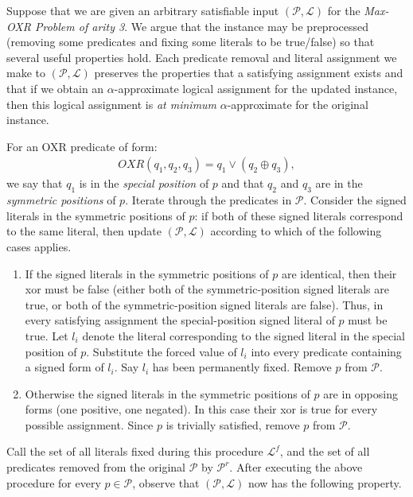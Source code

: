 \documentclass{article}
\begin{document}
Suppose that we are given an arbitrary satisfiable input $(\mathcal{P}, \mathcal{L})$ for the \textit{Max-OXR Problem of arity 3}. We argue that the instance may be preprocessed (removing some predicates and fixing some literals to be true/false) so that several useful properties hold.
Each predicate removal and literal assignment we make to $(\mathcal{P}, \mathcal{L})$ preserves the properties that a satisfying assignment exists and that if we obtain an $\alpha$-approximate logical assignment for the updated instance, then this logical assignment is \emph{at minimum} $\alpha$-approximate for the original instance.

For an OXR predicate of form:
\vspace{-2mm}
\begin{align*}\label{oxrform}
OXR(q_1,q_2,q_3)=q_1 \vee (q_2 \oplus q_3),
\end{align*}
we say that $q_1$ is in the \textit{special position} of $p$ and that $q_2$ and $q_3$ are in the \textit{symmetric positions} of $p$. Iterate through the predicates in $\mathcal{P}$.  Consider the signed literals in the symmetric positions of $p$: if both of these signed literals correspond to the same literal, then update $(\mathcal{P}, \mathcal{L})$ according to which of the following cases applies.

\begin{enumerate}
\item If the signed literals in the symmetric positions of $p$ are identical, then their xor must be false (either both of the symmetric-position signed literals are true, or both of the symmetric-position signed literals are false). Thus, in every satisfying assignment the special-position signed literal of $p$ must be true. 
Let $l_i$ denote the literal corresponding to the signed literal in the special position of $p$. Substitute the forced value of $l_i$ into every predicate containing a signed form of $l_i$. Say $l_i$ has been permanently fixed. Remove 
$p$ from $\mathcal{P}$. 

\item Otherwise the signed literals in the symmetric positions of $p$ are in opposing forms (one positive, one negated). In this case their xor is true for every possible assignment. Since $p$ is trivially satisfied, remove $p$ from $\mathcal{P}$.
\end{enumerate}
    
   Call the set of all literals fixed during this procedure $\mathcal{L}^f$, and the set of all predicates removed from the original $\mathcal{P}$ by $\mathcal{P}^r$.
After executing the above procedure for every $p\in \mathcal{P}$, observe that $(\mathcal{P}, \mathcal{L})$ now has the following property.  \\
\end{document}
